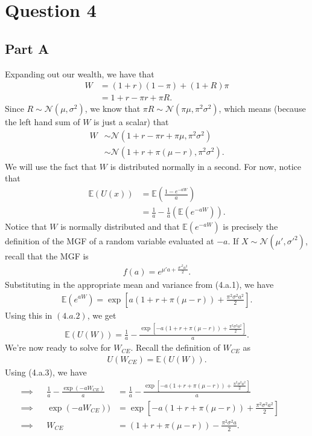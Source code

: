 \documentclass{article}
\begin{document}
\section*{Question 4}
\subsection*{Part A}
Expanding out our wealth, we have that
\begin{align*}
	W &= (1 + r)(1 - \pi) + (1 + R)\pi\\
	&=1 + r - \pi r + \pi R.
\end{align*}
Since $R\sim\mathcal{N}(\mu, \sigma^2)$, we know that $\pi R\sim\mathcal{N}(\pi \mu, \pi^2\sigma^2)$, which means (because the left hand sum of $W$ is just a scalar) that
\begin{align*}
	W &\sim \mathcal{N}(1 + r - \pi r + \pi\mu, \pi^2\sigma^2)\\
	&\sim \mathcal{N}(1 + r + \pi(\mu - r), \pi^2\sigma^2).\tag{4.a.1}
\end{align*}
We will use the fact that $W$ is distributed normally in a second. For now, notice that
\begin{align*}
	\mathbb{E}(U(x)) &= \mathbb{E}(\frac{1 - e^{-aW}}{a})\\
	&= \frac{1}{a} - \frac{1}{a}(\mathbb{E}(e^{-aW})).\tag{4.a.2}
\end{align*}
Notice that $W$ is normally distributed and that $\mathbb{E}(e^{-aW})$ is precisely the definition of the MGF of a random variable evaluated at $-a$. If $X\sim \mathcal{N}(\mu', \sigma'^2)$, recall that the MGF is
\begin{align*}
	f(a) = e^{\mu' a + \frac{\sigma'^2a^2}{2}}. 
\end{align*}
Substituting in the appropriate mean and variance from (4.a.1), we have
\begin{align*}
	\mathbb{E}(e^{aW}) = \exp[a(1 + r + \pi(\mu - r)) + \frac{\pi^2\sigma^2a^2}{2}].
\end{align*}
Using this in $(4.a.2)$, we get
\begin{align*}
	\mathbb{E}(U(W)) = \frac{1}{a} - \frac{\exp[-a(1 + r + \pi(\mu - r)) + \frac{\pi^2\sigma^2a^2}{2}]}{a}.\tag{4.a.3}
\end{align*}
We're now ready to solve for  $W_{CE}$. Recall the definition of $W_{CE}$ as
\begin{align*}
	U(W_{CE}) = \mathbb{E}(U(W)).
\end{align*}
Using (4.a.3), we have
\begin{align*}
	\implies & &\frac{1}{a} - \frac{\exp(-aW_{CE})}{a} &= \frac{1}{a} - \frac{\exp[-a(1 + r + \pi(\mu - r)) + \frac{\pi^2\sigma^2a^2}{2}]}{a} & &\\
	\implies & & \exp(-aW_{CE})) &= \exp[-a(1 + r + \pi(\mu - r)) + \frac{\pi^2\sigma^2a^2}{2}]\\
	\implies & & W_{CE} &= (1 + r + \pi(\mu - r)) - \frac{\pi^2\sigma^2a}{2}.\tag{4.a.4}
\end{align*}
\end{document}
